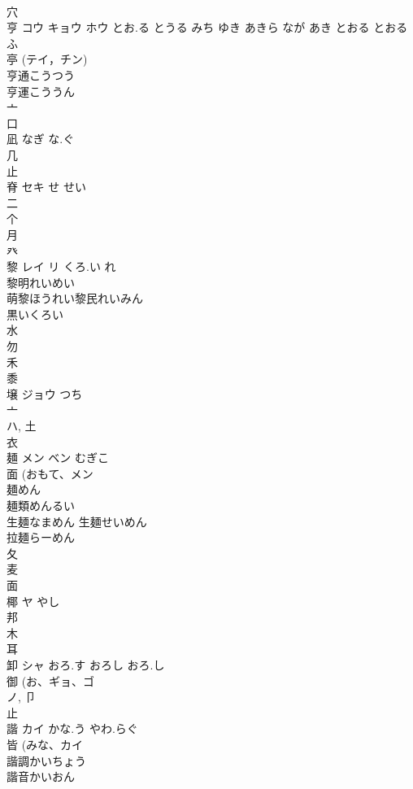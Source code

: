 \documentclass[8pt]{extreport}
\begin{document}
\begin{CJK}{UTF8}{min}
\\	穴 
\\	亨	コウ キョウ ホウ	とお.る とうる みち ゆき あきら なが あき とおる とおるふ	
\\	亭 (テイ，チン) 
\\	亨通こうつう
\\	亨運こううん
\\	亠 
\\	口 
\\	凪		なぎ な.ぐ	
\\	几 
\\	止 
\\	脊	セキ	せ せい	
\\	二 
\\	个 
\\	月 
\\	癶 
\\	黎	レイ リ	くろ.い れ	
\\	黎明れいめい
\\	萌黎ほうれい黎民れいみん
\\	黒いくろい
\\	水 
\\	勿 
\\	禾 
\\	黍 
\\	壌	ジョウ	つち	
\\	亠 
\\	ハ, 土 
\\	衣 
\\	麺	メン ベン	むぎこ	
\\	面 (おもて、メン 
\\	麺めん 
\\	麺類めんるい 
\\	生麺なまめん 生麺せいめん 
\\	拉麺らーめん 
\\	夂 
\\	麦 
\\	面 
\\	椰	ヤ	やし	
\\	邦 
\\	木 
\\	耳 
\\	卸	シャ	おろ.す おろし おろ.し	
\\	御 (お、ギョ、ゴ 
\\	ノ, 卩 
\\	止 
\\	諧	カイ	かな.う やわ.らぐ	
\\	皆 (みな、カイ 
\\	諧調かいちょう
\\	諧音かいおん

\end{CJK}
\end{document}
